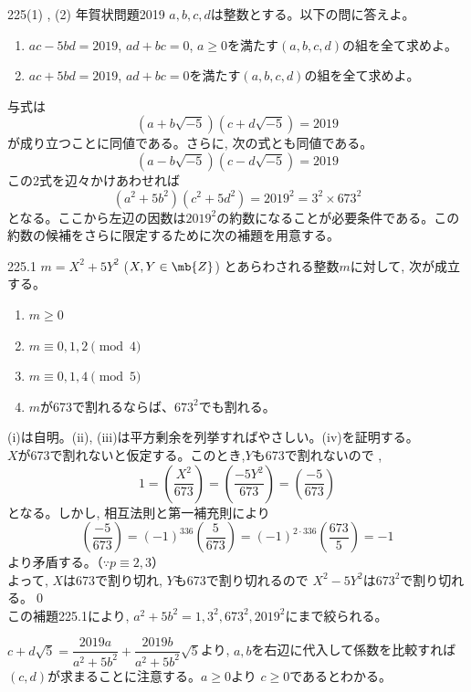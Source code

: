 \begin{prob}{225}{(1) , (2) }{年賀状問題2019}
 $a, b, c, d$は整数とする。以下の問に答えよ。
 \begin{enumerate}
  \item $ac-5bd=2019$, $ad+bc=0$, $a\ge 0$を満たす$(a, b, c, d)$の組を全て求めよ。
  \item $ac+5bd=2019$, $ad+bc=0$を満たす$(a, b, c, d)$の組を全て求めよ。
 \end{enumerate}
\end{prob}

与式は
\[(a+b\sqrt{-5})(c+d\sqrt{-5})=2019\]
が成り立つことに同値である。さらに, 次の式とも同値である。
\[(a-b\sqrt{-5})(c-d\sqrt{-5})=2019\]
この2式を辺々かけあわせれば
\[(a^2+5b^2)(c^2+5d^2)=2019^2=3^2\times 673^2\]
となる。ここから左辺の因数は$2019^2$の約数になることが必要条件である。この約数の候補をさらに限定するために次の補題を用意する。 
\begin{subthm}{225.1}
 $m=X^2+5Y^2$ ($X,Y\in \mb{Z}$) とあらわされる整数$m$に対して, 次が成立する。\\
 \begin{enumerate}[label=\roman*,align=CenterWithParen]
  \item $m\geq 0$
  \item $m\equiv 0, 1, 2 \pmod{4}$
  \item $m\equiv 0, 1, 4 \pmod{5}$
  \item $m$が673で割れるならば、$673^2$でも割れる。
 \end{enumerate}
\end{subthm}
(i)は自明。(ii), (iii)は平方剰余を列挙すればやさしい。(iv)を証明する。\\
$X$が673で割れないと仮定する。このとき,$Y$も673で割れないので
,\[1=\left(\dfrac{X^2}{673}\right)=\left(\dfrac{-5Y^2}{673}\right)=\left(\dfrac{-5}{673}\right)\]
となる。しかし, 相互法則と第一補充則により
\[ \left(\dfrac{-5}{673}\right)=(-1)^{336}\left(\dfrac{5}{673}\right)=(-1)^{2\cdot 336}\left(\dfrac{673}{5}\right)=-1 \]
より矛盾する。（$\because p\equiv 2,3$）\\
よって, $X$は673で割り切れ, $Y$も673で割り切れるので $X^2-5Y^2$は$673^2$で割り切れる。\qed\\
この補題225.1により, $a^2+5b^2=1,3^2,673^2,2019^2$にまで絞られる。

$c+d\sqrt{5}=\dfrac{2019a}{a^2+5b^2}+\dfrac{2019b}{a^2+5b^2}\sqrt{5}$より, $a,b$を右辺に代入して係数を比較すれば$(c,d)$が求まることに注意する。$a\geq 0$より $c\geq 0$であるとわかる。

